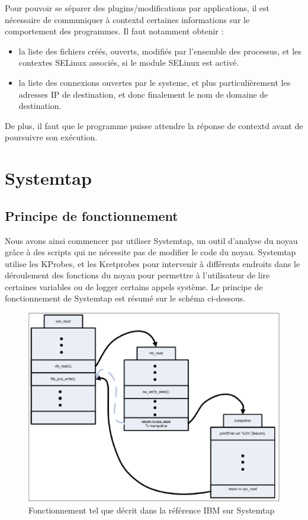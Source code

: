 \documentclass[pdftex,a4paper,titlepage,11pt,openright]{article}
\begin{document}
Pour pouvoir se séparer des plugins/modifications par applications, il est nécessaire de communiquer à contextd certaines informations sur le comportement des programmes. Il faut notamment obtenir :
\begin{itemize}
	\item la liste des fichiers créés, ouverts, modifiés par l'ensemble des processus, et les contextes SELinux associés, si le module SELinux est activé.
	\item la liste des connexions ouvertes par le systeme, et plus particulièrement les adresses IP de destination, et donc finalement le nom de domaine de destination.\\
\end{itemize}

De plus, il faut que le programme puisse attendre la réponse de contextd avant de poursuivre son exécution.

\newpage

\section{Systemtap}

\subsection{Principe de fonctionnement}

Nous avons ainsi commencer par utiliser Systemtap, un outil d'analyse du noyau grâce à des scripts qui ne nécessite pas de modifier le code du noyau. Systemtap utilise les KProbes, et les Kretprobes\cite{IBMRBST} pour intervenir à différents endroits dans le déroulement des fonctions du noyau pour permettre à l'utilisateur de lire certaines variables ou de logger certains appels système. Le principe de fonctionnement de Systemtap est résumé sur le schéma ci-dessous.

\begin{figure}[hb]
	\centering
	\includegraphics[scale=0.4]{kretprob.png}
	\caption{Fonctionnement tel que décrit dans la référence IBM sur Systemtap \cite{IBMRBST}}
\end{figure}
\end{document}
